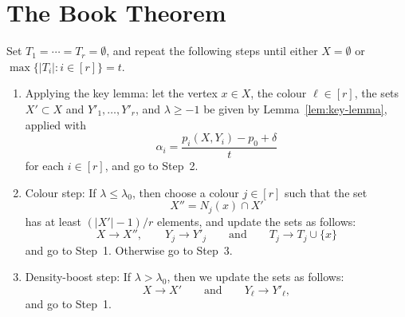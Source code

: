 
\section{The Book Theorem}


\begin{algorithm}\label{alg:book}
  Set \(T_1 = \cdots = T_r = \emptyset\), and repeat the following steps until either \(X = \emptyset\) or \(\max\big\{ |T_i| : i \in [r] \big\} = t\). 
  \begin{enumerate}
  \item\label{Alg:Step1} Applying the key lemma: let the vertex \(x \in X\), the colour \(\ell \in [r]\), the sets \(X' \subset X\) and \(Y'_1,\ldots,Y'_r\), and \(\lambda \ge -1\) be given by Lemma~\ref{lem:key-lemma}, applied with
  \begin{equation}\label{def:alpha}
  \alpha_i = \frac{p_i(X,Y_i) - p_0 + \delta}{t}
  \end{equation}
  for each \(i \in [r]\), and go to Step~2.\smallskip
  \item\label{Alg:Step2} Colour step: If \(\lambda \le \lambda_0\), then choose a colour \(j \in [r]\) such that the set
  \begin{equation*}
    X'' = N_j(x) \cap X'
  \end{equation*}
  has at least \((|X'| - 1)/r\) elements, and update the sets as follows:
  \begin{equation*}
    X \to X'', \qquad Y_j \to Y'_j \qquad \text{and} \qquad T_j \to T_j \cup \{x\}
  \end{equation*}
  and go to Step~1. Otherwise go to Step~3.\smallskip
  \item\label{Alg:Step3} Density-boost step: If \(\lambda > \lambda_0\), then we update the sets as follows:
  \begin{equation*}
    X \to X' \qquad \text{and} \qquad Y_\ell \to Y'_\ell,
  \end{equation*}
  and go to Step~1.
  \end{enumerate}  
\end{algorithm} 

